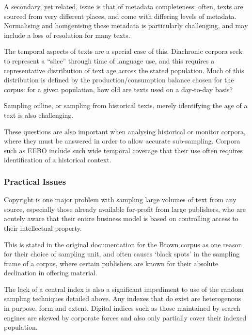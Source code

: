 A secondary, yet related, issue is that of metadata completeness: often, texts are sourced from very different places, and come with differing levels of metadata.  Normalising and homgenising these metadata is particularly challenging, and may include a loss of resolution for many texts.

The temporal aspects of texts are a special case of this.  Diachronic corpora seek to represent a ``slice'' through time of language use, and this requires a representative distribution of text age across the stated population.  Much of this distribution is defined by the production/consumption balance chosen for the corpus: for a given population, how old are texts used on a day-to-day basis?

Sampling online, or sampling from historical texts, merely identifying the age of a text is also challenging.

These questions are also important when analysing historical or monitor corpora, where they must be answered in order to allow accurate sub-sampling.  Corpora such as EEBO\cite{blum2002early} include such wide temporal coverage that their use often requires identification of a historical context.







\subsubsection{Practical Issues}
Copyright is one major problem with sampling large volumes of text from any source, especially those already available for-profit from large publishers, who are acutely aware that their entire business model is based on controlling access to their intellectual property.

This is stated in the original documentation for the Brown corpus as one reason for their choice of sampling unit, and often causes `black spots' in the sampling frame of a corpus, where certain publishers are known for their absolute declination in offering material.


The lack of a central index is also a significant impediment to use of the random sampling techniques detailed above.  
Any indexes that do exist are heterogenous in purpose, form and extent. Digital indices such as those maintained by search engines are skewed by corporate forces and also only partially cover their indexed population.

